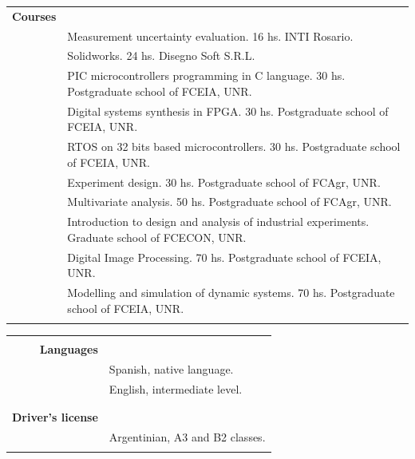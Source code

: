 \documentclass[a4paper,10pt, sans]{article}
\begin{document}
\begin{table}[H]
\begin{tabularx}{\textwidth}{r X}
    
    \textbf{Courses} & {}\\ [1ex]
    {} & Measurement uncertainty evaluation. 16 hs. INTI Rosario. \\  [1ex]
    {} & Solidworks. 24 hs. Disegno Soft S.R.L. \\  [1ex]
    {} & PIC microcontrollers programming in C language. 30 hs. Postgraduate school of FCEIA, UNR. \\  [1ex]
    {} & Digital systems synthesis in FPGA. 30 hs. Postgraduate school of FCEIA, UNR. \\  [1ex]
    {} & RTOS on 32 bits based microcontrollers. 30 hs. Postgraduate school of FCEIA, UNR. \\  [1ex]
    {} & Experiment design. 30 hs. Postgraduate school of FCAgr, UNR. \\  [1ex]
    {} & Multivariate analysis. 50 hs. Postgraduate school of FCAgr, UNR. \\  [1ex]
    {} & Introduction to design and analysis of industrial experiments. Graduate school of FCECON, UNR. \\  [1ex]
    {} & Digital Image Processing. 70 hs. Postgraduate school of FCEIA, UNR. \\  [1ex]
    {} & Modelling and simulation of dynamic systems. 70 hs. Postgraduate school of FCEIA, UNR. \\ \\   
    
  \end{tabularx}
  \end{table}



  
  \begin{table}[H]
  \centering
  \begin{tabularx}{\textwidth}{r X}  
    
    \hline \\  
    \textbf{Languages} & {} \\ [1ex]
    {} & Spanish, native language. \\ [1ex]
    {} & English, intermediate level. \\ \\ \hline \\
      
    \textbf{Driver's license} & {} \\ [1ex]
    {} & Argentinian, A3 and B2 classes.\\
    
  \vspace{5cm}
  \end{tabularx}
  \end{table}
  
\end{document}
